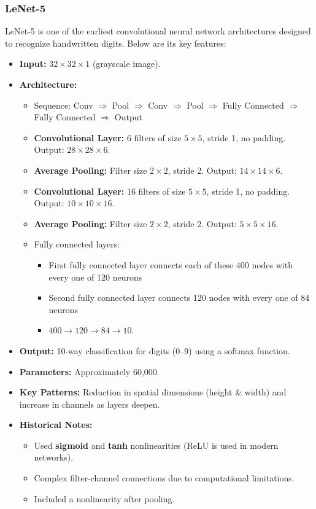 \documentclass[letterpaper,12pt,notitlepage,twoside]{report}
\begin{document}
\subsubsection{LeNet-5}
LeNet-5 is one of the earliest convolutional neural network architectures designed to recognize handwritten digits. Below are its key features:
\begin{itemize}
    \item \textbf{Input:} $32 \times 32 \times 1$ (grayscale image).
    \item \textbf{Architecture:}
    \begin{itemize}
        \item Sequence: Conv $\Rightarrow$ Pool $\Rightarrow$ Conv $\Rightarrow$ Pool $\Rightarrow$ Fully Connected $\Rightarrow$ Fully Connected  $\Rightarrow$ Output
        \item \textbf{Convolutional Layer:} 6 filters of size $5 \times 5$, stride 1, no padding. Output: $28 \times 28 \times 6$.
        \item \textbf{Average Pooling:} Filter size $2 \times 2$, stride 2. Output: $14 \times 14 \times 6$.
        \item \textbf{Convolutional Layer:} 16 filters of size $5 \times 5$, stride 1, no padding. Output: $10 \times 10 \times 16$.
        \item \textbf{Average Pooling:} Filter size $2 \times 2$, stride 2. Output: $5 \times 5 \times 16$.
        \item Fully connected layers: 
	\begin{itemize}
	\item First fully connected layer connects each of these 400 nodes with every one of 120 neurons
	\item Second fully connected layer connects 120 nodes with every one of 84 neurons
	\item $400 \rightarrow 120 \rightarrow 84 \rightarrow 10$.
	\end{itemize}
    \end{itemize}
    \item \textbf{Output:} 10-way classification for digits (0–9) using a softmax function.
    \item \textbf{Parameters:} Approximately 60,000.
    \item \textbf{Key Patterns:} Reduction in spatial dimensions (height \& width) and increase in channels as layers deepen.
    \item \textbf{Historical Notes:}
    \begin{itemize}
        \item Used \textbf{sigmoid} and \textbf{tanh} nonlinearities (ReLU is used in modern networks).
        \item Complex filter-channel connections due to computational limitations.
        \item Included a nonlinearity after pooling.
    \end{itemize}
\end{itemize}
\end{document}
